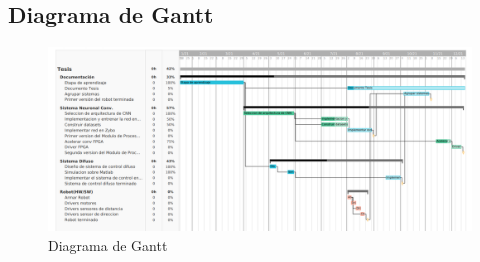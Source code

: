 \begin{landscape}
    \subsection{Diagrama de Gantt}
    \begin{figure}[ht]
    	\includegraphics[width=0.95\linewidth]{Tesis/Capitulos/APENDICE_A/img/Gantt.png}
    	\caption{Diagrama de Gantt}
    	\label{fig:diagrama}
	\end{figure} 
\end{landscape}
